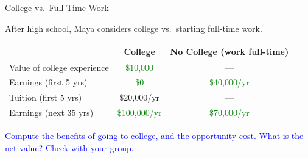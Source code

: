 \documentclass[9pt,english,aspectratio=169]{beamer}
\begin{document}
\begin{frame}{College vs.\ Full-Time Work}

  After high school, Maya considers college vs.\ starting full-time work.

  \vspace{0.5em}
  \centering
  \begin{tabular}{l c c}
    \toprule
    & \textbf{College} & \textbf{No College (work full-time)} \\
    \midrule
    Value of college experience    & \textcolor{green}{\$10,000}     & --- \\
    Earnings (first 5 yrs)         & \textcolor{green}{\$0}          & \textcolor{green}{\$40,000/yr} \\
    Tuition  (first 5 yrs)         & \textcolor{vermillion}{\$20,000/yr}  & --- \\
    Earnings (next 35 yrs)         & \textcolor{green}{\$100,000/yr} & \textcolor{green}{\$70,000/yr} \\
    \bottomrule
  \end{tabular}

  \vspace{1em}
  \begin{center}
    \Large\textcolor{blue}{Compute the benefits of going to college, and the opportunity cost. What is the net value? Check with your group.}
  \end{center}

\end{frame}
\end{document}
